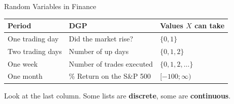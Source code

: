\documentclass[9pt,english,aspectratio=169]{beamer}
\begin{document}
\begin{frame}{Random Variables in Finance}

  \vspace{0.3em}
  \centering
  \renewcommand{\arraystretch}{1.45}
  \begin{tabular}{@{} l l l @{}}
    \toprule
    \textbf{Period}     & \textbf{DGP}              & \textbf{Values  $X$ can take} \\
    \midrule
    One trading day     & Did the market rise?          & $\{ 0, 1 \}$ \\
    Two trading days    & Number of up days             & $\{0, 1, 2\}$ \\
    One week            & Number of trades executed     & $\{0, 1, 2, \ldots\}$ \\
    One month           & \% Return on the S\&P 500     & $[-100; \infty)$ \\
    \bottomrule
  \end{tabular}
  \pause

  \vspace{1.2em}
  \begin{insightbox}
    Look at the last column. Some lists are \textbf{discrete}, some are \textbf{continuous}. 
  \end{insightbox}

\end{frame}
\end{document}
